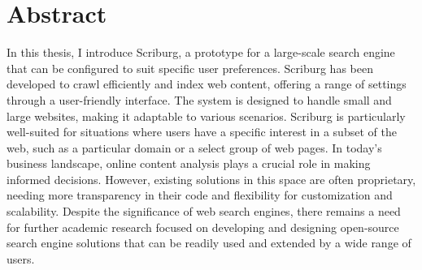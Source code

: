 \chapter*{Abstract}
In this thesis, I introduce Scriburg, a prototype for a large-scale search engine that can be configured to suit specific user preferences. Scriburg has been developed to crawl efficiently and index web content, offering a range of settings through a user-friendly interface. The system is designed to handle small and large websites, making it adaptable to various scenarios. Scriburg is particularly well-suited for situations where users have a specific interest in a subset of the web, such as a particular domain or a select group of web pages. In today's business landscape, online content analysis plays a crucial role in making informed decisions. However, existing solutions in this space are often proprietary, needing more transparency in their code and flexibility for customization and scalability. Despite the significance of web search engines, there remains a need for further academic research focused on developing and designing open-source search engine solutions that can be readily used and extended by a wide range of users.